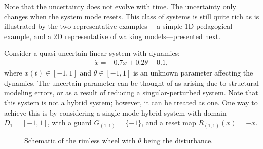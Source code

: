 Note that the uncertainty does not evolve with time.
The uncertainty only changes when the system mode resets.
This class of systems is still quite rich as is illustrated by the two representative examples ---a simple 1D pedagogical example, and a 2D representative of walking models---presented next.
\begin{example}
\label{example:1D}
Consider a quasi-uncertain linear system with dynamics:
\begin{align}
	\dot x = -0.7x+0.2\theta-0.1,
\end{align}
where \mbox{$x(t)\in [-1,1]$} and $\theta\in [-1,1]$ is an unknown parameter affecting the dynamics.
The uncertain parameter can be thought of as arising due to structural modeling errors, or as a result of reducing a singular-perturbed system.
Note that this system is not a hybrid system; however, it can be treated as one.
One way to achieve this is by considering a single mode hybrid system with domain $D_1 = [-1,1]$, with a guard $ G_{(1,1)} = \{-1\}$, and a reset map $R_{(1,1)}(x) = -x$.
\end{example}
\begin{figure}[!t]
\centering
  \caption{Schematic of the rimless wheel with $\theta$ being the disturbance.}
  \label{fig:rw_schematic}
\end{figure}

